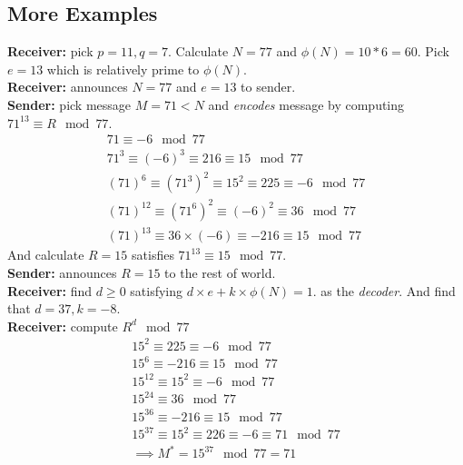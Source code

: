 \documentclass[10pt]{article}
\begin{document}
	    \subsection{More Examples}
	    \begin{example}
	        \textbf{Receiver: } pick $p = 11, q = 7$. Calculate $N = 77$ and $\phi(N) = 10 * 6 = 60$. Pick $e=13$ which is relatively prime to $\phi(N)$.\\
	       \textbf{Receiver: } announces $N=77$ and $e=13$ to sender. \\
	       \textbf{Sender: } pick message $M=71<N$ and \emph{encodes} message by computing $71^{13} \equiv R \mod 77$. 
	       \begin{gather*}
	           71 \equiv -6 \mod 77 \\
	           71^3 \equiv (-6)^3 \equiv 216 \equiv 15 \mod 77 \\
	           (71)^6 \equiv (71^3)^2 \equiv 15^2 \equiv 225 \equiv -6 \mod 77 \\
	           (71)^{12} \equiv (71^6)^2 \equiv (-6)^2 \equiv 36 \mod 77 \\
	           (71)^{13} \equiv 36 \times (-6) \equiv -216 \equiv 15 \mod 77
	       \end{gather*}
	       And calculate $R=15$ satisfies $71^{13} \equiv 15 \mod 77$. \\
	       \textbf{Sender: } announces $R = 15$ to the rest of world. \\
	       \textbf{Receiver: } find $d \geq 0$ satisfying $d \times e + k \times \phi(N) = 1$. as the \emph{decoder}. And find that $d=37, k=-8$. \\
	       \textbf{Receiver: } compute $R^d \mod 77$ 
	       \begin{gather*}
	           15^2 \equiv 225 \equiv -6 \mod 77 \\
	           15^6 \equiv -216 \equiv 15 \mod 77 \\
	           15^{12} \equiv 15^2 \equiv -6 \mod 77 \\
	           15^{24} \equiv 36 \mod 77 \\
	           15^{36} \equiv -216 \equiv 15 \mod 77 \\
	           15^{37} \equiv 15^2 \equiv 226 \equiv -6 \equiv 71 \mod 77 \\
	           \implies M^* = 15^{37} \mod 77 = 71
	       \end{gather*}
	    \end{example}
	    
\end{document}
